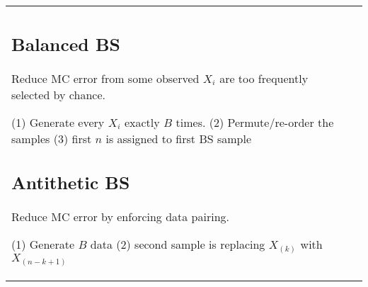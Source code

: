 \begin{tabulary}{\textwidth}{l L}
\subsection{Balanced BS}

Reduce MC error from some observed $X_i$ are too frequently selected by chance.

(1) Generate every $X_i$ exactly $B$ times. (2) Permute/re-order the samples (3) first $n$ is assigned to first BS sample

\subsection{Antithetic BS}

Reduce MC error by enforcing data pairing.

(1) Generate $B$ data (2) second sample is replacing $X_{(k)}$ with $X_{(n-k+1)}$

\end{tabulary}